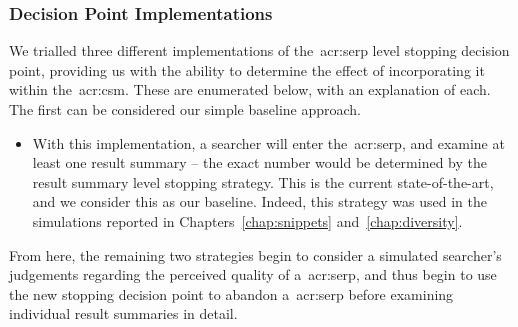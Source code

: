 \subsubsection{Decision Point Implementations}\label{sec:serp:method:serp_dp:implementations}
We trialled three different implementations of the~\gls{acr:serp} level stopping decision point, providing us with the ability to determine the effect of incorporating it within the~\gls{acr:csm}. These are enumerated below, with an explanation of each. The first can be considered our simple baseline approach.

\begin{itemize}
    \item{ With this implementation, a searcher will  enter the~\gls{acr:serp}, and examine at least one result summary -- the exact number would be determined by the result summary level stopping strategy. This is the current state-of-the-art, and we consider this as our baseline. Indeed, this strategy was used in the simulations reported in Chapters~\ref{chap:snippets} and~\ref{chap:diversity}.}
\end{itemize}

From here, the remaining two strategies begin to consider a simulated searcher's judgements regarding the perceived quality of a~\gls{acr:serp}, and thus begin to use the new stopping decision point to abandon a~\gls{acr:serp} before examining individual result summaries in detail.

